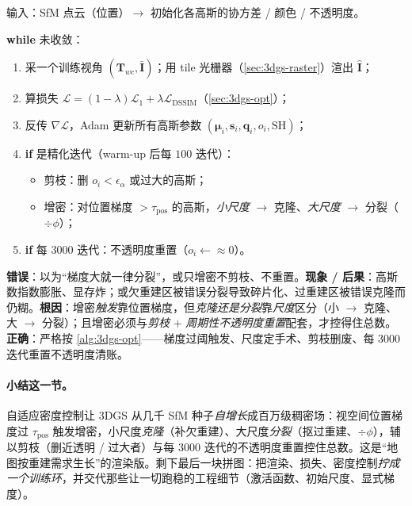 \begin{algo}
\label{alg:3dgs-opt}
输入：SfM 点云（位置）$\to$ 初始化各高斯的协方差 / 颜色 / 不透明度。\par
\textbf{while} 未收敛：
\begin{enumerate}
  \item 采一个训练视角 $(\mathbf T_{wc},\bar{\mathbf I})$；用 tile 光栅器（\cref{sec:3dgs-raster}）渲出 $\hat{\mathbf I}$；
  \item 算损失 $\mathcal L=(1-\lambda)\mathcal L_1+\lambda\mathcal L_{\mathrm{DSSIM}}$（\cref{sec:3dgs-opt}）；
  \item 反传 $\nabla\mathcal L$，Adam 更新所有高斯参数 $(\boldsymbol\mu_i,\mathbf s_i,\mathbf q_i,o_i,\text{SH})$；
  \item \textbf{if} 是精化迭代（warm-up 后每 $100$ 迭代）：
  \begin{itemize}
    \item 剪枝：删 $o_i<\epsilon_\alpha$ 或过大的高斯；
    \item 增密：对位置梯度 $>\tau_{\mathrm{pos}}$ 的高斯，\emph{小尺度} $\to$ 克隆、\emph{大尺度} $\to$ 分裂（$\div\phi$）；
  \end{itemize}
  \item \textbf{if} 每 $3000$ 迭代：不透明度重置（$o_i\!\leftarrow\!\approx 0$）。
\end{enumerate}
\end{algo}

\begin{pitfall}
\textbf{错误}：以为“梯度大就一律分裂”，或只增密不剪枝、不重置。\textbf{现象 / 后果}：高斯数指数膨胀、显存炸；或欠重建区被错误分裂导致碎片化、过重建区被错误克隆而仍糊。\textbf{根因}：增密\emph{触发}靠位置梯度，但\emph{克隆还是分裂}靠\emph{尺度}区分（小 $\to$ 克隆、大 $\to$ 分裂）；且增密必须与\emph{剪枝} $+$ \emph{周期性不透明度重置}配套，才控得住总数。\textbf{正确}：严格按 \cref{alg:3dgs-opt}——梯度过阈触发、尺度定手术、剪枝删废、每 $3000$ 迭代重置不透明度清账。
\end{pitfall}

\paragraph{小结这一节。}
自适应密度控制让 3DGS 从几千 SfM 种子\emph{自增长}成百万级稠密场：视空间位置梯度过 $\tau_{\mathrm{pos}}$ 触发增密，小尺度\emph{克隆}（补欠重建）、大尺度\emph{分裂}（抠过重建、$\div\phi$），辅以剪枝（删近透明 / 过大者）与每 $3000$ 迭代的不透明度重置控住总数。这是“地图按重建需求生长”的渲染版。剩下最后一块拼图：把渲染、损失、密度控制\emph{拧成一个训练环}，并交代那些让一切跑稳的工程细节（激活函数、初始尺度、显式梯度）。

